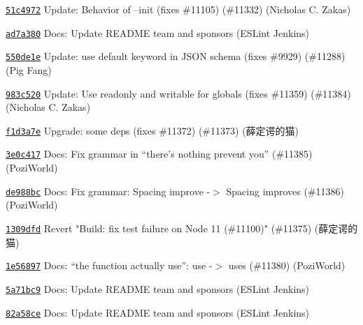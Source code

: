 \begin{DoxyItemize}
\item \href{https://github.com/eslint/eslint/commit/51c497298a15ad296a2b1f8fc397df687976b836}{\texttt{ {\ttfamily 51c4972}}} Update\+: Behavior of --init (fixes \#11105) (\#11332) (Nicholas C. Zakas)
\item \href{https://github.com/eslint/eslint/commit/ad7a38097c32a91e5a831ef1bc8933601532576c}{\texttt{ {\ttfamily ad7a380}}} Docs\+: Update README team and sponsors (ESLint Jenkins)
\item \href{https://github.com/eslint/eslint/commit/550de1e611a1e9af873bcb18d74cf2056e8d2e1b}{\texttt{ {\ttfamily 550de1e}}} Update\+: use {\ttfamily default} keyword in JSON schema (fixes \#9929) (\#11288) (Pig Fang)
\item \href{https://github.com/eslint/eslint/commit/983c5201210d7a4ffab0b3d05ab9919c0754e5ca}{\texttt{ {\ttfamily 983c520}}} Update\+: Use \textquotesingle{}readonly\textquotesingle{} and \textquotesingle{}writable\textquotesingle{} for globals (fixes \#11359) (\#11384) (Nicholas C. Zakas)
\item \href{https://github.com/eslint/eslint/commit/f1d3a7ee7c82365989e219b1dae379f08f6dd526}{\texttt{ {\ttfamily f1d3a7e}}} Upgrade\+: some deps (fixes \#11372) (\#11373) (薛定谔的猫)
\item \href{https://github.com/eslint/eslint/commit/3e0c4176eff085498b813f8ba1732d7ed6ee44f8}{\texttt{ {\ttfamily 3e0c417}}} Docs\+: Fix grammar in “there’s nothing prevent you” (\#11385) (Pozi\+World)
\item \href{https://github.com/eslint/eslint/commit/de988bc909b491366ad0cd9bc83f4d6de42d041a}{\texttt{ {\ttfamily de988bc}}} Docs\+: Fix grammar\+: Spacing improve -\/\texorpdfstring{$>$}{>} Spacing improves (\#11386) (Pozi\+World)
\item \href{https://github.com/eslint/eslint/commit/1309dfdebb5595460b79dcac20df6a1f109e7566}{\texttt{ {\ttfamily 1309dfd}}} Revert "{}\+Build\+: fix test failure on Node 11 (\#11100)"{} (\#11375) (薛定谔的猫)
\item \href{https://github.com/eslint/eslint/commit/1e56897db3e254e0aef6d2fe3274157fc379c79e}{\texttt{ {\ttfamily 1e56897}}} Docs\+: “the function actually use”\+: use -\/\texorpdfstring{$>$}{>} uses (\#11380) (Pozi\+World)
\item \href{https://github.com/eslint/eslint/commit/5a71bc95a7e961b1b1b77022645e0bd9cdd08dc0}{\texttt{ {\ttfamily 5a71bc9}}} Docs\+: Update README team and sponsors (ESLint Jenkins)
\item \href{https://github.com/eslint/eslint/commit/82a58ce26b282fd80335b3ac4fc88f21266c3ba1}{\texttt{ {\ttfamily 82a58ce}}} Docs\+: Update README team and sponsors (ESLint Jenkins)

\end{DoxyItemize}
